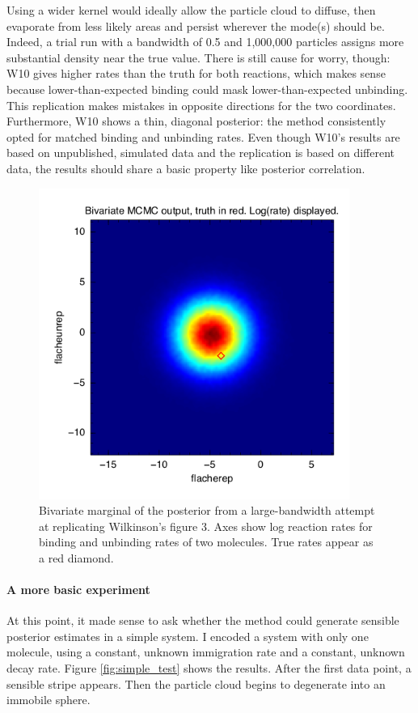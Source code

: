 \documentclass{article}
\begin{document}
Using a wider kernel would ideally allow the particle cloud to diffuse, then evaporate from less likely areas and persist wherever the mode(s) should be. Indeed, a trial run with a bandwidth of 0.5 and 1,000,000 particles assigns more substantial density near the true value. There is still cause for worry, though: W10 gives higher rates than the truth for both reactions, which makes sense because lower-than-expected binding could mask lower-than-expected unbinding. This replication makes mistakes in opposite directions for the two coordinates. Furthermore, W10 shows a thin, diagonal posterior: the method consistently opted for matched binding and unbinding rates. Even though W10's results are based on unpublished, simulated data and the replication is based on different data, the results should share a basic property like posterior correlation.

\begin{figure}[h!]
\begin{center}
\includegraphics[height=4in,width=4in]{SigD_trial_large_bw_may_29.png}
\caption{Bivariate marginal of the posterior from a large-bandwidth attempt at replicating Wilkinson's figure 3. Axes show log reaction rates for binding and unbinding rates of two molecules. True rates appear as a red diamond. \label{fig:SigD_trial_may29}}
\end{center}

\end{figure}

\paragraph{A more basic experiment}
At this point, it made sense to ask whether the method could generate sensible posterior estimates in a simple system. I encoded a system with only one molecule, using a constant, unknown immigration rate and a constant, unknown decay rate. Figure \ref{fig:simple_test} shows the results. After the first data point, a sensible stripe appears. Then the particle cloud begins to degenerate into an immobile sphere.
\end{document}
